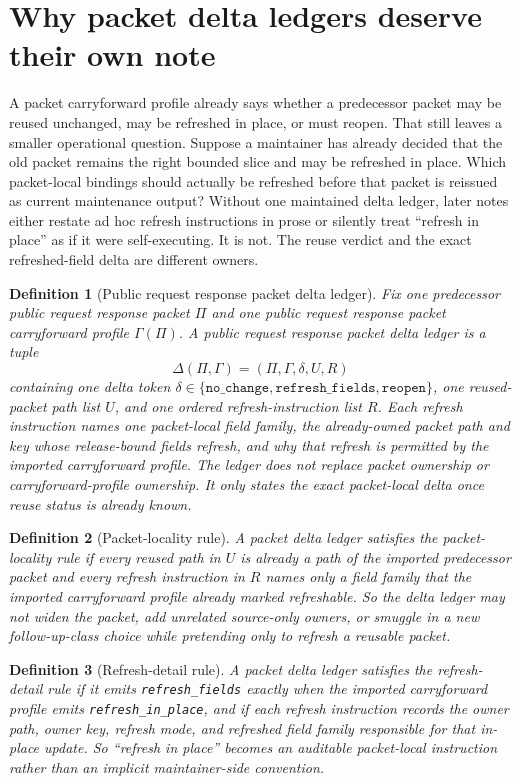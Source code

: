 \documentclass[11pt]{article}
\newtheorem{definition}{Definition}
\begin{document}
\section{Why packet delta ledgers deserve their own note}
A packet carryforward profile already says whether a predecessor packet may be reused unchanged, may be refreshed in place, or must reopen.
That still leaves a smaller operational question.
Suppose a maintainer has already decided that the old packet remains the right bounded slice and may be refreshed in place.
Which packet-local bindings should actually be refreshed before that packet is reissued as current maintenance output?
Without one maintained delta ledger, later notes either restate ad hoc refresh instructions in prose or silently treat ``refresh in place'' as if it were self-executing.
It is not.
The reuse verdict and the exact refreshed-field delta are different owners.

\begin{definition}[Public request response packet delta ledger]
Fix one predecessor public request response packet $\Pi$ and one public request response packet carryforward profile $\Gamma(\Pi)$.
A \emph{public request response packet delta ledger} is a tuple
\[
\Delta(\Pi,\Gamma)=(\Pi,\Gamma,\delta,U,R)
\]
containing one delta token $\delta\in\{\texttt{no\_change},\texttt{refresh\_fields},\texttt{reopen}\}$, one reused-packet path list $U$, and one ordered refresh-instruction list $R$.
Each refresh instruction names one packet-local field family, the already-owned packet path and key whose release-bound fields refresh, and why that refresh is permitted by the imported carryforward profile.
The ledger does not replace packet ownership or carryforward-profile ownership.
It only states the exact packet-local delta once reuse status is already known.
\end{definition}

\begin{definition}[Packet-locality rule]
A packet delta ledger satisfies the \emph{packet-locality rule} if every reused path in $U$ is already a path of the imported predecessor packet and every refresh instruction in $R$ names only a field family that the imported carryforward profile already marked refreshable.
So the delta ledger may not widen the packet, add unrelated source-only owners, or smuggle in a new follow-up-class choice while pretending only to refresh a reusable packet.
\end{definition}

\begin{definition}[Refresh-detail rule]
A packet delta ledger satisfies the \emph{refresh-detail rule} if it emits \texttt{refresh\_fields} exactly when the imported carryforward profile emits \texttt{refresh\_in\_place}, and if each refresh instruction records the owner path, owner key, refresh mode, and refreshed field family responsible for that in-place update.
So ``refresh in place'' becomes an auditable packet-local instruction rather than an implicit maintainer-side convention.
\end{definition}
\end{document}
